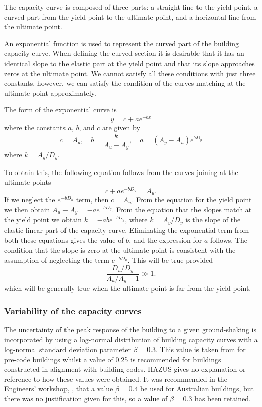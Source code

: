 The capacity curve is composed of three
parts: a straight line to the yield point, a curved part from the
yield point to the ultimate point, and a horizontal line from the
ultimate point.


An exponential function is used to represent the curved part of
the building capacity curve.  When defining
the curved section it is desirable that it has an identical slope
to the elastic part at the yield point and that its slope
approaches zeros at the ultimate point. We cannot satisfy all
these conditions with just three constants, however, we can
satisfy the condition of the curves matching at the ultimate point
approximately.

The form of the exponential curve is
$$
 y = c + a e^{-bx}
$$
where the constants $a$, $b$, and $c$ are given by
\begin{equation}
c = A_u,\quad b = \frac{k}{A_u-A_y}, \quad
a = (A_y-A_u)e^{b D_y}
\end{equation}
where $k = A_y/D_y$.

To obtain this, the following equation follows from the curves
joining at the ultimate points
$$
 c+ae^{-bD_u} = A_u.
$$
If we neglect the $e^{-bD_u}$ term, then $c=A_u$. From the
equation for the yield point we then obtain $A_u-A_y =
-ae^{-bD_y}$. From the equation that the slopes match at the yield
point we obtain $k = -abe^{-bD_y}$, where $k=A_y/D_y$ is the slope
of the elastic linear part of the capacity curve. Eliminating the exponential term from both these equations
gives the value of $b$, and the expression for $a$ follows. The
condition that the slope is zero at the ultimate point is
consistent with the assumption of neglecting the term $e^{-bD_u}$.
This will be true provided
$$
 \frac{D_u/D_y}{A_u/A_y-1} \gg 1.
$$
which will be generally true when the ultimate point is far from the
yield point.


\subsubsection{Variability of the capacity curves}
\label{sec:dam-capacity-var}

The uncertainty of the peak response of the building to a given
ground-shaking is incorporated by using a log-normal distribution
of building capacity curves with a
log-normal standard deviation parameter $\beta=0.3$. This value is
taken from \cite{dr_FEMA99b} for pre-code buildings whilst a value
of 0.25 is recommended for buildings constructed in alignment with
building codes. HAZUS gives no explanation or reference to how
these values were obtained. It was recommended in the Engineers'
workshop, \cite{dr_Stehle01a}, that a value $\beta=0.4$ be used
for Australian buildings, but there was no justification given for
this, so a value of $\beta=0.3$ has been retained.

